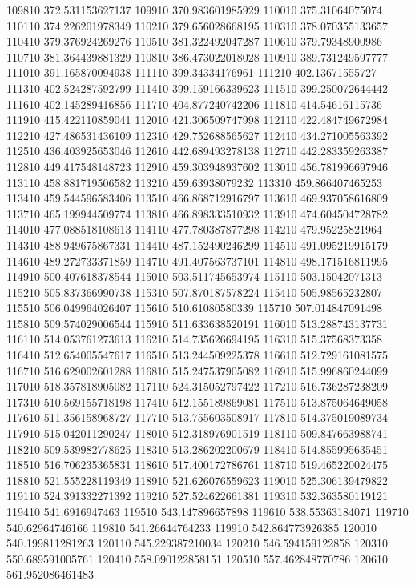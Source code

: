 {109810 372.531153627137
109910 370.983601985929
110010 375.31064075074
110110 374.226201978349
110210 379.656028668195
110310 378.070355133657
110410 379.376924269276
110510 381.322492047287
110610 379.79348900986
110710 381.364439881329
110810 386.473022018028
110910 389.731249597777
111010 391.165870094938
111110 399.34334176961
111210 402.13671555727
111310 402.524287592799
111410 399.159166339623
111510 399.250072644442
111610 402.145289416856
111710 404.877240742206
111810 414.54616115736
111910 415.422110859041
112010 421.306509747998
112110 422.484749672984
112210 427.486531436109
112310 429.752688565627
112410 434.271005563392
112510 436.403925653046
112610 442.689493278138
112710 442.283359263387
112810 449.417548148723
112910 459.303948937602
113010 456.781996697946
113110 458.881719506582
113210 459.63938079232
113310 459.866407465253
113410 459.544596583406
113510 466.868712916797
113610 469.937058616809
113710 465.199944509774
113810 466.898333510932
113910 474.604504728782
114010 477.088518108613
114110 477.780387877298
114210 479.95225821964
114310 488.949675867331
114410 487.152490246299
114510 491.095219915179
114610 489.272733371859
114710 491.407563737101
114810 498.171516811995
114910 500.407618378544
115010 503.511745653974
115110 503.15042071313
115210 505.837366990738
115310 507.870187578224
115410 505.98565232807
115510 506.049964026407
115610 510.61080580339
115710 507.014847091498
115810 509.574029006544
115910 511.633638520191
116010 513.288743137731
116110 514.053761273613
116210 514.735626694195
116310 515.37568373358
116410 512.654005547617
116510 513.244509225378
116610 512.729161081575
116710 516.629002601288
116810 515.247537905082
116910 515.996860244099
117010 518.357818905082
117110 524.315052797422
117210 516.736287238209
117310 510.569155718198
117410 512.155189869081
117510 513.875064649058
117610 511.356158968727
117710 513.755603508917
117810 514.375019089734
117910 515.042011290247
118010 512.318976901519
118110 509.847663988741
118210 509.539982778625
118310 513.286202200679
118410 514.855995635451
118510 516.706235365831
118610 517.400172786761
118710 519.465220024475
118810 521.555228119349
118910 521.626076559623
119010 525.306139479822
119110 524.391332271392
119210 527.524622661381
119310 532.363580119121
119410 541.6916947463
119510 543.147896657898
119610 538.55363184071
119710 540.62964746166
119810 541.26644764233
119910 542.864773926385
120010 540.199811281263
120110 545.229387210034
120210 546.594159122858
120310 550.689591005761
120410 558.090122858151
120510 557.462848770786
120610 561.952086461483
}
